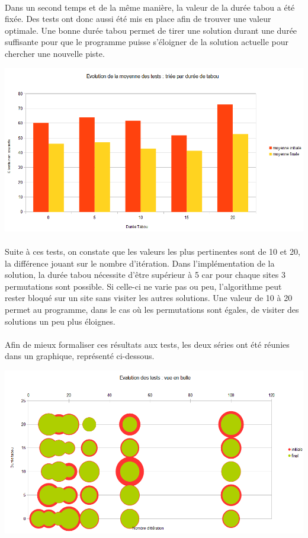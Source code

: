 \documentclass[a4paper, 11pt]{report}
\begin{document}
    \paragraph{}Dans un second temps et de la même manière, la valeur de la durée tabou a été fixée. Des tests ont donc aussi été mis en place afin de trouver une valeur optimale.
    Une bonne durée tabou permet de tirer une solution durant une durée suffisante pour que le
    programme puisse s'éloigner de la solution actuelle pour chercher une nouvelle piste.
    \begin{center} \includegraphics[width=14cm]{tableau_duree_tabou} \end{center}
    \paragraph{}Suite à ces tests, on constate que les valeurs les plus pertinentes sont de 10 et 20,
    la différence jouant sur le nombre d'itération. Dans l'implémentation de la solution, la durée
    tabou nécessite d'être supérieur à 5 car pour chaque sites 3 permutations sont possible. Si
    celle-ci ne varie pas ou peu, l'algorithme peut rester bloqué sur un site sans visiter les autres
    solutions. Une valeur de 10 à 20 permet au programme, dans le cas où les permutations sont
    égales, de visiter des solutions un peu plus éloignes.


    \paragraph{}Afin de mieux formaliser ces résultats aux tests, les deux séries ont été réunies dans un graphique, représenté ci-dessous.
    \begin{center} \includegraphics[width=14cm]{tableau_bubulle} \end{center}
\end{document}
